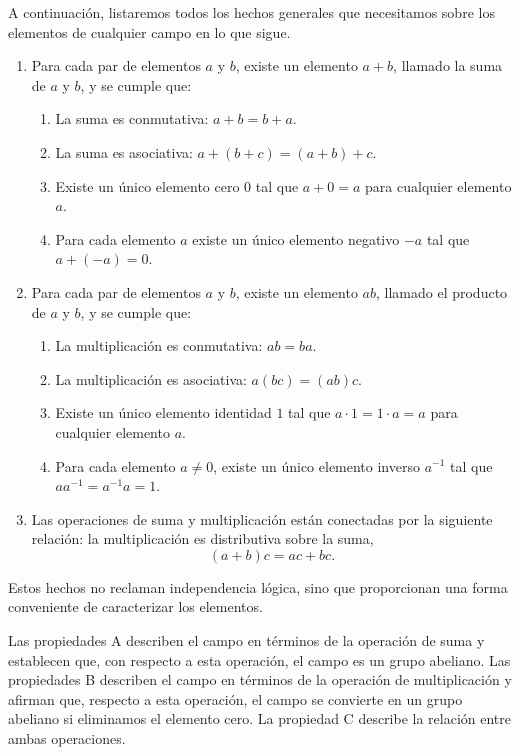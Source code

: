 A continuación, listaremos todos los hechos generales que necesitamos sobre los elementos de cualquier campo en lo que sigue.
\begin{enumerate}[label=\Alph*.]
    \item Para cada par de elementos $a$ y $b$, existe un elemento $a + b$, llamado la suma de $a$ y $b$, y se cumple que:
    \begin{enumerate}[label=\arabic*.]
        \item La suma es conmutativa: $a + b = b + a$.
        \item La suma es asociativa: $a + (b + c) = (a + b) + c$.
        \item Existe un único elemento cero $0$ tal que $a + 0 = a$ para cualquier elemento $a$.
        \item Para cada elemento $a$ existe un único elemento negativo $-a$ tal que $a + (-a) = 0$.
    \end{enumerate}
    \item Para cada par de elementos $a$ y $b$, existe un elemento $ab$, llamado el producto de $a$ y $b$, y se cumple que:
    \begin{enumerate}[label=\arabic*.]
        \item La multiplicación es conmutativa: $ab = ba$.
        \item La multiplicación es asociativa: $a (bc) = (ab) c$.
        \item Existe un único elemento identidad $1$ tal que $a \cdot 1 = 1 \cdot a = a$ para cualquier elemento $a$.
        \item Para cada elemento $a \neq 0$, existe un único elemento inverso $a^{-1}$ tal que $aa^{-1} = a^{-1}a = 1$.
    \end{enumerate}
    \item Las operaciones de suma y multiplicación están conectadas por la siguiente relación: la multiplicación es distributiva sobre la suma,
    $$(a + b) c = ac + bc.$$
\end{enumerate}
Estos hechos no reclaman independencia lógica, sino que proporcionan una forma conveniente de caracterizar los elementos.

Las propiedades A describen el campo en términos de la operación de suma y establecen que, con respecto a esta operación, el campo es un grupo abeliano. Las propiedades B describen el campo en términos de la operación de multiplicación y afirman que, respecto a esta operación, el campo se convierte en un grupo abeliano si eliminamos el elemento cero. La propiedad C describe la relación entre ambas operaciones.
